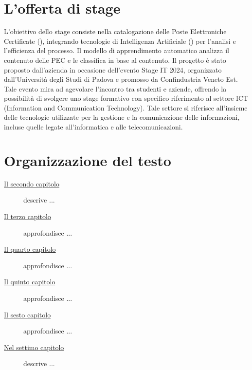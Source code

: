 \section{L'offerta di stage}
L'obiettivo dello stage consiste nella catalogazione delle Poste Elettroniche Certificate (), integrando tecnologie di Intelligenza Artificiale () per l'analisi e l'efficienza del processo. 
\newline
Il modello di apprendimento automatico analizza il contenuto delle PEC e le classifica in base al contenuto. 
\newline
Il progetto è stato proposto dall'azienda in occasione dell'evento Stage IT 2024, organizzato dall'Università degli Studi di Padova e promosso da Confindustria Veneto Est. Tale evento mira ad agevolare l'incontro tra studenti e aziende, offrendo la possibilità di svolgere uno stage formativo con specifico riferimento al settore ICT (Information and Communication Technology). Tale settore si riferisce all'insieme delle tecnologie utilizzate per la gestione e la comunicazione delle informazioni, incluse quelle legate all'informatica e alle telecomunicazioni.

\section{Organizzazione del testo}

\begin{description}
    \item[{\hyperref[cap:processi-metodologie]{Il secondo capitolo}}] descrive ...
    
    \item[{\hyperref[cap:descrizione-stage]{Il terzo capitolo}}] approfondisce ...
    
    \item[{\hyperref[cap:analisi-requisiti]{Il quarto capitolo}}] approfondisce ...
    
    \item[{\hyperref[cap:progettazione-codifica]{Il quinto capitolo}}] approfondisce ...
    
    \item[{\hyperref[cap:verifica-validazione]{Il sesto capitolo}}] approfondisce ...
    
    \item[{\hyperref[cap:conclusioni]{Nel settimo capitolo}}] descrive ...
\end{description}